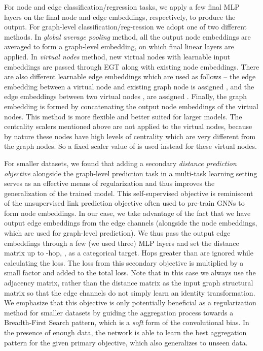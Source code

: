 \documentclass[sigconf,authorversion]{acmart}
\begin{document}
For node and edge classification/regression tasks, we apply a few final MLP layers on the final node and edge embeddings, respectively, to produce the output. For graph-level classification/reg-ression we adopt one of two different methods. In \emph{global average pooling} method, all the output node embeddings are averaged to form a graph-level embedding, on which final linear layers are applied. In \emph{virtual nodes} method,  new virtual nodes with learnable input embeddings  are passed through EGT along with existing node embeddings. There are also  different learnable edge embeddings  which are used as follows -- the edge embedding between a virtual node  and existing graph node  is assigned , and the edge embeddings between two virtual nodes , are assigned . Finally, the graph embedding is formed by concatenating the output node embeddings of the virtual nodes. This method is more flexible and better suited for larger models. The centrality scalers mentioned above are not applied to the virtual nodes, because by nature these nodes have high levels of centrality which are very different from the graph nodes. So a fixed scaler value of  is used instead for these virtual nodes.

For smaller datasets, we found that adding a secondary \emph{distance prediction objective} alongside the graph-level prediction task in a multi-task learning setting serves as an effective means of regularization and thus improves the generalization of the trained model. This self-supervised objective is reminiscent of the unsupervised link prediction objective often used to pre-train GNNs to form node embeddings. In our case, we take advantage of the fact that we have output edge embeddings from the edge channels (alongside the node embeddings, which are used for graph-level prediction). We thus pass the output edge embeddings through a few (we used three) MLP layers and set the distance matrix up to -hop, , as a categorical target. Hops greater than  are ignored while calculating the loss. The loss from this secondary objective is multiplied by a small factor  and added to the total loss. Note that in this case we always use the adjacency matrix, rather than the distance matrix as the input graph structural matrix so that the edge channels do not simply learn an identity transformation. We emphasize that this objective is only potentially beneficial as a regularization method for smaller datasets by guiding the aggregation process towards a Breadth-First Search pattern, which is a \emph{soft} form of the convolutional bias. In the presence of enough data, the network is able to learn the best aggregation pattern for the given primary objective, which also generalizes to unseen data.
\end{document}
